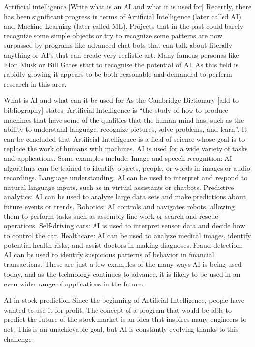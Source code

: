 \documentclass[a4paper,twoside,12pt]{book}
\begin{document}
\begin{itemize}
Artificial intelligence [Write what is an AI and what it is used for]
Recently, there has been significant progress in terms of Artificial Intelligence (later called AI) and Machine Learning (later called ML). Projects that in the past could barely recognize some simple objects or try to recognize some patterns are now surpassed by programs like advanced chat bots that can talk about literally anything or AI’s that can create very realistic art. Many famous personas like Elon Musk or Bill Gates start to recognize the potential of AI. 
As this field is rapidly growing it appears to be both reasonable and demanded to perform research in this area.

What is AI and what can it be used for
As the Cambridge Dictionary [add to bibliography] states, Artificial Intelligence is “the study of how to produce machines that have some of the qualities that the human mind has, such as the ability to understand language, recognize pictures, solve problems, and learn”. It can be concluded that Artificial Intelligence is a field of science whose goal is to replace the work of humans with machines.
AI is used for a wide variety of tasks and applications. Some examples include:
Image and speech recognition: AI algorithms can be trained to identify objects, people, or words in images or audio recordings.
Language understanding: AI can be used to interpret and respond to natural language inputs, such as in virtual assistants or chatbots.
Predictive analytics: AI can be used to analyze large data sets and make predictions about future events or trends.
Robotics: AI controls and navigates robots, allowing them to perform tasks such as assembly line work or search-and-rescue operations.
Self-driving cars: AI is used to interpret sensor data and decide how to control the car.
Healthcare: AI can be used to analyze medical images, identify potential health risks, and assist doctors in making diagnoses.
Fraud detection: AI can be used to identify suspicious patterns of behavior in financial transactions.
These are just a few examples of the many ways AI is being used today, and as the technology continues to advance, it is likely to be used in an even wider range of applications in the future.


AI in stock prediction
Since the beginning of Artificial Intelligence, people have wanted to use it for profit. The concept of a program that would be able to predict the future of the stock market is an idea that inspires many engineers to act. This is an unachievable goal, but AI is constantly evolving thanks to this challenge.


\end{itemize}
\end{document}
